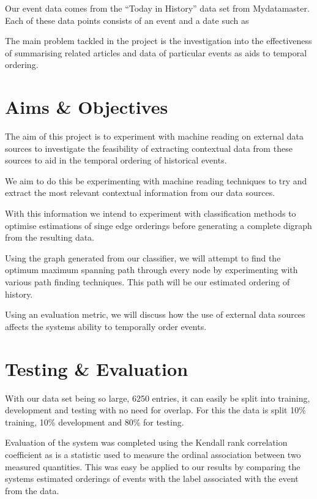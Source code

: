 \documentclass[bsc,frontabs,twoside,singlespacing,parskip,deptreport]{infthesis}     %
\begin{document}
Our event data comes from the ``Today in History'' data set from Mydatamaster\cite{mydatamaster}. Each of these data points consists
of an event and a date such as
\begin{equation}
  [ \text{``Alaska becomes 49th State''}, \text{``1959-01-01''} ]\nonumber
\end{equation}

The main problem tackled in the project is the investigation into the effectiveness of
summarising related articles and data of particular
events as aids to temporal ordering. 

\section{Aims \& Objectives}
The aim of this project is to experiment with machine reading on external data sources to
investigate the feasibility of extracting contextual data from these sources to aid in the
temporal ordering of historical events.

We aim to do this be experimenting with machine reading techniques to try and extract the most
relevant contextual information from our data sources.

With this information we intend to experiment with classification methods to optimise estimations
of singe edge orderings before generating a complete digraph from the resulting data.

Using the graph generated from our classifier, we will attempt to find the optimum maximum spanning path
through every node by experimenting with various path finding techniques.
This path will be our estimated ordering of history.


Using an evaluation metric, we will discuss how the use of external data sources affects the systems ability to
temporally order events.

\section{Testing \& Evaluation}
With our data set being so large, 6250 entries, it can
easily be split into training, development and testing with no
need for overlap. For this the data is split 10\% training,
10\% development and 80\% for testing.

Evaluation of the system was completed using the
Kendall rank correlation coefficient as is a statistic
used to measure the ordinal association between two
measured quantities. This was easy be applied to our results
by comparing the systems estimated orderings of events
with the label associated with the event from the data.
\end{document}
